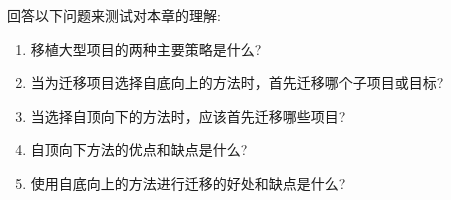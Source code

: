 回答以下问题来测试对本章的理解:

\begin{enumerate}
\item 
移植大型项目的两种主要策略是什么?

\item 
当为迁移项目选择自底向上的方法时，首先迁移哪个子项目或目标?

\item 
当选择自顶向下的方法时，应该首先迁移哪些项目?

\item 
自顶向下方法的优点和缺点是什么?

\item 
使用自底向上的方法进行迁移的好处和缺点是什么?
\end{enumerate}